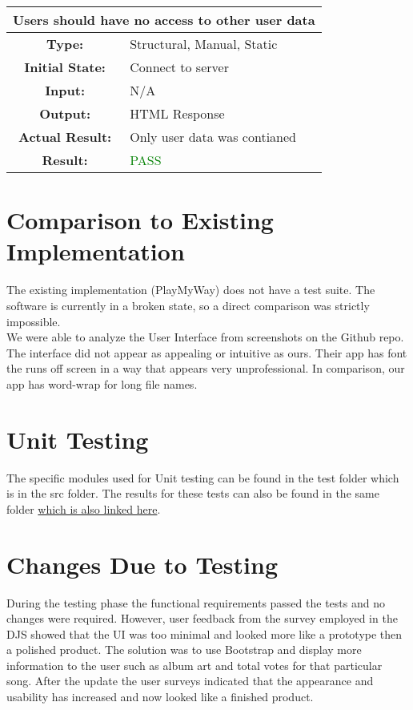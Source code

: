 \documentclass[12pt, titlepage]{article}
\begin{document}
\begin{center}
\begin{table}[H]
\begin{tabularx}{\textwidth}{| c X |}
\hline
\multicolumn{2}{|c|}{\textbf{Users should have no access to other user data}}\\
\hline
\textbf{Type: } & Structural, Manual, Static\\
\textbf{Initial State: } & Connect to server\\
\textbf{Input: } & N/A\\
\textbf{Output: } & HTML Response \\
\textbf{Actual Result:  } & Only user data was contianed \\
\textbf{Result: } & \textcolor{green}{PASS}\\
\hline
\end{tabularx}
\end{table}
\end{center}

\section{Comparison to Existing Implementation}	
The existing implementation (PlayMyWay) does not have a test suite. The software is currently in a broken state, so a direct comparison was strictly impossible.\\

We were able to analyze the User Interface from screenshots on the Github repo. The interface did not appear as appealing or intuitive as ours. Their app has font the runs off screen in a way that appears very unprofessional. In comparison, our app has word-wrap for long file names.\\

\section{Unit Testing}
The specific modules used for Unit testing can be found in the test folder which is in the src folder. The results for these tests can also be found in the same folder \href{run:../../src/test/Test-Report-001-12-1-2016.PNG}{which is also linked here}.

\section{Changes Due to Testing}
During the testing phase the functional requirements passed the tests and no changes were required. However, user feedback from the survey employed in the DJS showed that the UI was too minimal and looked more like a prototype then a polished product. The solution was to use Bootstrap and display more information to the user such as album art and total votes for that particular song. After the update the user surveys indicated that the appearance and usability has increased and now looked like a finished product.
\end{document}
